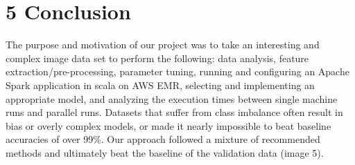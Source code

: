 \documentclass{neu_handout}
\begin{document}
\section*{5 Conclusion}
The purpose and motivation of our project was to take an interesting and complex image data set to perform the following: data analysis, feature extraction/pre-processing, parameter tuning, running and configuring an Apache Spark application in scala on AWS EMR, selecting and implementing an appropriate model, and analyzing the execution times between single machine runs and parallel runs. Datasets that suffer from class imbalance often result in bias or overly complex models, or made it nearly impossible to beat baseline accuracies of over 99\%. Our approach followed a mixture of recommended methods and ultimately beat the baseline of the validation data (image 5).


\newpage
\end{document}
